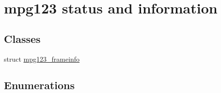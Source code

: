 \hypertarget{group__mpg123__status}{}\section{mpg123 status and information}
\label{group__mpg123__status}
\subsection*{Classes}
\begin{DoxyCompactItemize}
\item 
struct \hyperlink{structmpg123__frameinfo}{mpg123\+\_\+frameinfo}
\end{DoxyCompactItemize}
\subsection*{Enumerations}

